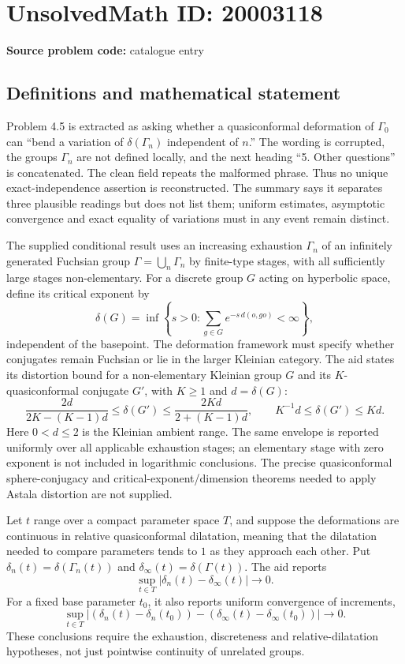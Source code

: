 \documentclass[11pt]{article}
\begin{document}
\section*{UnsolvedMath ID: 20003118}
\textbf{Source problem code:} catalogue entry
\subsection{Definitions and mathematical statement}
Problem 4.5 is extracted as asking whether a quasiconformal deformation of $\Gamma_0$ can ``bend a variation of $\delta(\Gamma_n)$ independent of $n$.'' The wording is corrupted, the groups $\Gamma_n$ are not defined locally, and the next heading ``5. Other questions'' is concatenated. The clean field repeats the malformed phrase. Thus no unique exact-independence assertion is reconstructed. The summary says it separates three plausible readings but does not list them; uniform estimates, asymptotic convergence and exact equality of variations must in any event remain distinct.

The supplied conditional result uses an increasing exhaustion $\Gamma_n$ of an infinitely generated Fuchsian group $\Gamma=\bigcup_n\Gamma_n$ by finite-type stages, with all sufficiently large stages non-elementary. For a discrete group $G$ acting on hyperbolic space, define its critical exponent by
\[
 \delta(G)=\inf\left\{s>0:\sum_{g\in G}e^{-s\,d(o,go)}<\infty\right\},
\]
independent of the basepoint. The deformation framework must specify whether conjugates remain Fuchsian or lie in the larger Kleinian category. The aid states its distortion bound for a non-elementary Kleinian group $G$ and its $K$-quasiconformal conjugate $G'$, with $K\geq1$ and $d=\delta(G)$:
\[
 \frac{2d}{2K-(K-1)d}\leq\delta(G')
 \leq\frac{2Kd}{2+(K-1)d},\qquad
 K^{-1}d\leq\delta(G')\leq Kd.
\]
Here $0<d\leq2$ is the Kleinian ambient range. The same envelope is reported uniformly over all applicable exhaustion stages; an elementary stage with zero exponent is not included in logarithmic conclusions. The precise quasiconformal sphere-conjugacy and critical-exponent/dimension theorems needed to apply Astala distortion are not supplied.

Let $t$ range over a compact parameter space $T$, and suppose the deformations are continuous in relative quasiconformal dilatation, meaning that the dilatation needed to compare parameters tends to $1$ as they approach each other. Put $\delta_n(t)=\delta(\Gamma_n(t))$ and $\delta_\infty(t)=\delta(\Gamma(t))$. The aid reports
\[
 \sup_{t\in T}|\delta_n(t)-\delta_\infty(t)|\longrightarrow0.
\]
For a fixed base parameter $t_0$, it also reports uniform convergence of increments,
\[
 \sup_{t\in T}|(\delta_n(t)-\delta_n(t_0))
 -(\delta_\infty(t)-\delta_\infty(t_0))|\longrightarrow0.
\]
These conclusions require the exhaustion, discreteness and relative-dilatation hypotheses, not just pointwise continuity of unrelated groups.
\end{document}

